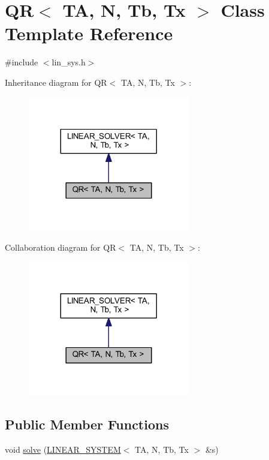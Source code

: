 \hypertarget{class_q_r}{}\section{QR$<$ TA, N, Tb, Tx $>$ Class Template Reference}
\label{class_q_r}


{\ttfamily \#include $<$lin\+\_\+sys.\+h$>$}



Inheritance diagram for QR$<$ TA, N, Tb, Tx $>$\+:
\nopagebreak
\begin{figure}[H]
\begin{center}
\leavevmode
\includegraphics[width=200pt]{class_q_r__inherit__graph}
\end{center}
\end{figure}


Collaboration diagram for QR$<$ TA, N, Tb, Tx $>$\+:
\nopagebreak
\begin{figure}[H]
\begin{center}
\leavevmode
\includegraphics[width=200pt]{class_q_r__coll__graph}
\end{center}
\end{figure}
\subsection*{Public Member Functions}
\begin{DoxyCompactItemize}
\item 
void \mbox{\hyperlink{class_q_r_ab8f49cec36214bdcd9fca78e89c3737e}{solve}} (\mbox{\hyperlink{class_l_i_n_e_a_r___s_y_s_t_e_m}{L\+I\+N\+E\+A\+R\+\_\+\+S\+Y\+S\+T\+EM}}$<$ TA, N, Tb, Tx $>$ \&s)
\end{DoxyCompactItemize}


